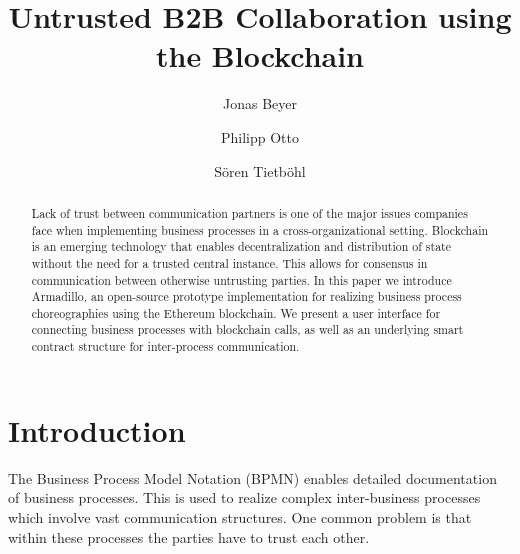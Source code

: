 \documentclass[runningheads]{llncs}
\begin{document}
%
\title{Untrusted B2B Collaboration using the Blockchain}
%
%
\author{Jonas Beyer \and
Philipp Otto\and
S\"oren Tietb\"ohl}
%
%
%
\maketitle %
%
\begin{abstract}
Lack of trust between communication partners is one of the major issues companies face when implementing business processes in a cross-organizational setting.
Blockchain is an emerging technology that enables decentralization and distribution of state without the need for a trusted central instance.
This allows for consensus in communication between otherwise untrusting parties.
In this paper we introduce Armadillo, an open-source prototype implementation for realizing business process choreographies using the Ethereum blockchain.
We present a user interface for connecting business processes with blockchain calls, as well as an underlying smart contract structure for inter-process communication.

\end{abstract}
%
%
%
\section{Introduction}





The Business Process Model Notation (BPMN) enables detailed documentation of business processes. This is used to realize complex inter-business processes which involve vast communication structures. One common problem is that within these processes the parties have to trust each other.
\end{document}
